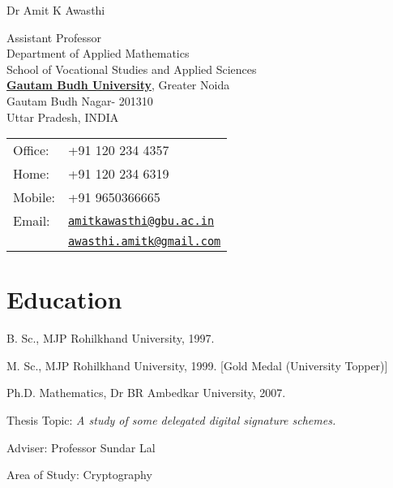 \documentclass[letterpaper]{article}
\def\name{Dr Amit K Awasthi}
\renewenvironment{itemize}{
  \begin{list}{}{
    \setlength{\leftmargin}{1.5em}
  }
}{
  \end{list}
}
\begin{document}
{\huge \name}


\vspace{0.25in}

\begin{minipage}{0.55\linewidth}
Assistant Professor\\
Department of Applied Mathematics \\
School of Vocational Studies and Applied Sciences\\
  \href{http://www.gbu.ac.in/}{\textbf{Gautam Budh University}},	Greater Noida \\
Gautam Budh Nagar- 201310\\
Uttar Pradesh, INDIA
\end{minipage}
\begin{minipage}{0.40\linewidth}
  \begin{tabular}{ll}
	Office: & +91 120 234 4357 \\
	Home: & +91 120 234 6319 \\
    Mobile: & +91 9650366665 \\
    Email: & \href{mailto:amitkawasthi@gbu.ac.in}{\tt amitkawasthi@gbu.ac.in} \\
		 & \href{mailto:awasthi.amitk@gmail.com}{\tt awasthi.amitk@gmail.com} \\
  \end{tabular}
\end{minipage}

\section*{Education}

\begin{itemize}
  \item B. Sc., MJP Rohilkhand University, 1997.

  \item M. Sc., MJP Rohilkhand University, 1999. [Gold Medal (University Topper)]

  \item Ph.D. Mathematics, Dr BR Ambedkar University, 2007.
	      \begin{itemize}
        \item Thesis Topic: \emph{A study of some delegated digital signature schemes.}
				\item Adviser: Professor Sundar Lal
        \item Area of Study: Cryptography
        \end{itemize}
\end{itemize}
\end{document}
